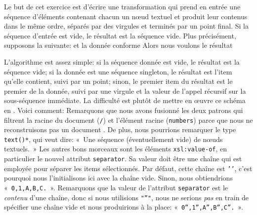 \label{par:CSV}

Le but de cet exercice est d'écrire une transformation \XSLT qui prend
en entrée une séquence d'éléments contenant chacun un n{\oe}ud textuel
et produit leur contenus dans le même ordre, séparés par des virgules
et terminés par un point final. Si la séquence d'entrée est vide, le
résultat est la séquence vide. Plus précisément, supposons la \DTD suivante:
\noindent et la donnée conforme
\noindent Alors nous voulons le résultat

L'algorithme est assez simple: si la séquence donnée est vide, le
résultat est la séquence vide; si la donnée est une séquence
singleton, le résultat est l'item qu'elle contient, suivi par un
point; sinon, le premier item du résultat est le premier de la donnée,
suivi par une virgule et la valeur de l'appel récursif sur la
sous-séquence immédiate. La difficulté est plutôt de mettre en
{\oe}uvre ce schéma en \XSLT. Voici comment:
\noindent Remarquons que nous avons fusionné les deux patrons qui
filtrent la racine du document (\texttt{/}) et l'élément racine
(\texttt{numbers}) parce que nous ne reconstruisons pas un document
\XML. De plus, nous pourrions remarquer le type \texttt{text()*}, qui
veut dire: «~Une séquence (éventuellement vide) de n{\oe}uds textuels.~»
Les autres bons morceaux sont les éléments \texttt{xsl:value-of}, en
particulier le nouvel attribut \texttt{separator}. Sa valeur doit être
une chaîne qui est employée pour séparer les items sélectionnés. Par
défaut, cette chaîne est \texttt{'\textvisiblespace'}, c'est pourquoi
nous l'initialisons ici avec la chaîne vide. Sinon, nous obtiendrions
«~\texttt{0\textvisiblespace,1\textvisiblespace,A\textvisiblespace,B\textvisiblespace,C\textvisiblespace.}~». Remarquons
que la valeur de l'attribut \texttt{separator} est le \emph{contenu}
d'une chaîne, donc si nous utilisions \texttt{"''"}, nous ne serions
\emph{pas} en train de spécifier une chaîne vide et nous produirions à
la place: «~\texttt{0'',1'',A'',B'',C''.}~».

